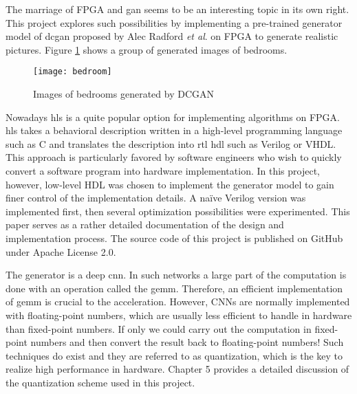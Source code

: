 The marriage of \gls{FPGA} and \gls{gan} seems to be an interesting topic in its own right. This project
explores such possibilities by implementing a pre-trained generator model of \gls{dcgan} proposed by
Alec Radford \textit{et al}. \cite{radford:conv_gan} on FPGA to generate realistic pictures.
Figure \ref{fig:bedroom} shows a group of generated images of bedrooms.

\begin{figure}[h]
  \centering
  \texttt{[image: bedroom]}
  \caption{Images of bedrooms generated by DCGAN \cite{radford:conv_gan}}
  \label{fig:bedroom}
\end{figure}

Nowadays \gls{hls} is a quite popular option for implementing algorithms on \gls{FPGA}. \gls{hls} takes a
behavioral description written in a high-level programming language such as C and translates the description
into \gls{rtl} \gls{hdl} such as Verilog or VHDL. This approach is particularly favored by software
engineers who wish to quickly convert a software program into hardware implementation. In this project,
however, low-level HDL was chosen to implement the generator model to gain finer control of the implementation
details. A naïve Verilog version was implemented first, then several optimization possibilities were
experimented. This paper serves as a rather detailed documentation of the design and implementation process.
The source code of this project is published on GitHub \cite{github:dcgan_fpga} under Apache License 2.0.

The generator is a deep \gls{cnn}. In such networks a large part of the computation is done with an
operation called the \gls{gemm}. Therefore, an efficient implementation of \gls{gemm} is crucial to the
acceleration. However, CNNs are normally implemented with floating-point numbers, which are usually less
efficient to handle in hardware than fixed-point numbers. If only we could carry out the computation in
fixed-point numbers and then convert the result back to floating-point numbers! Such techniques do exist
and they are referred to as quantization, which is the key to realize high performance in hardware. Chapter 5
provides a detailed discussion of the quantization scheme used in this project.

\clearpage %
